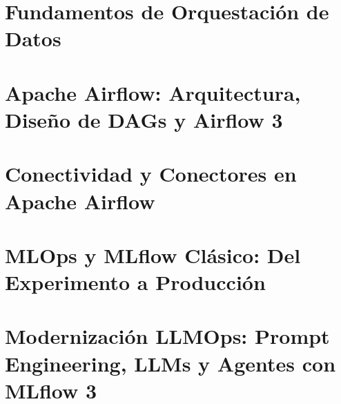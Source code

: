 \documentclass[10pt,a4paper,oneside]{book}
\begin{document}
\frontmatter



\cleardoublepage
{}
{}
\tableofcontents

\cleardoublepage
{}
{}
\listoffigures

\cleardoublepage
{}
{}
\listoftables

\cleardoublepage
{}
{}
\renewcommand{\lstlistlistingname}{Índice de Listados de Código}
\lstlistoflistings

\mainmatter

\part{Fundamentos de Orquestación de Datos}


\part{Apache Airflow: Arquitectura, Diseño de DAGs y Airflow 3}



\part{Conectividad y Conectores en Apache Airflow}



\part{MLOps y MLflow Clásico: Del Experimento a Producción}



\part{Modernización LLMOps: Prompt Engineering, LLMs y Agentes con MLflow 3}


\end{document}

